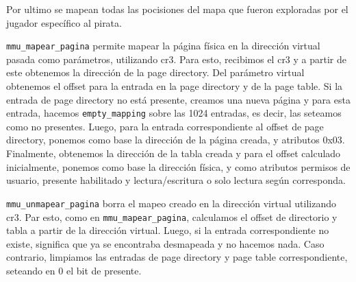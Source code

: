 Por ultimo se mapean todas las pocisiones del mapa que fueron exploradas por el jugador específico al pirata. 


\texttt{mmu\_mapear\_pagina} permite mapear la página física en la dirección virtual pasada como parámetros, utilizando cr3. Para esto, recibimos el cr3 y a partir de este obtenemos la dirección de la page directory. Del parámetro virtual obtenemos el offset para la entrada en la page directory y de la page table. Si la entrada de page directory no está presente, creamos una nueva página y para esta entrada, hacemos \texttt{empty\_mapping} sobre las 1024 entradas, es decir, las seteamos como no presentes.
Luego, para la entrada correspondiente al offset de page directory, ponemos como base la dirección de la página creada, y atributos 0x03. 
Finalmente, obtenemos la dirección de la tabla creada y para el offset calculado inicialmente, ponemos como base la dirección física, y como atributos permisos de usuario, presente habilitado y lectura/escritura o solo lectura según corresponda.

\texttt{mmu\_unmapear\_pagina} borra el mapeo creado en la dirección virtual utilizando cr3. Par esto, como en \texttt{mmu\_mapear\_pagina}, calculamos el offset de directorio y tabla a partir de la dirección virtual. Luego, si la entrada correspondiente no existe, significa que ya se encontraba desmapeada y no hacemos nada. Caso contrario, limpiamos las entradas de page directory y page table correspondiente, seteando en 0 el bit de presente.